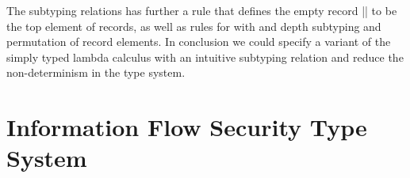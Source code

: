 The subtyping relations has further a rule that defines the empty
record \code|{}| to be the top element of records, as well as rules
for with and depth subtyping and permutation of record elements. In
conclusion we could specify a variant of the simply typed lambda
calculus with an intuitive subtyping relation and reduce the
non-determinism in the type system.

\section{Information Flow Security Type System}
\label{sec:inform-flow-secur-1}

